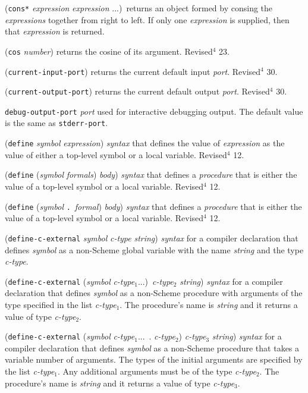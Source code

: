 \documentclass[10pt,twocolumn]{article}
\begin{document}
(\texttt{cons*} \emph{expression} \emph{expression} ...)\ returns an object
formed by consing the \emph{expressions} together from right to left. If
only one \emph{expression} is supplied, then that \emph{expression} is
returned.

(\texttt{cos} \emph{number}) returns the cosine of its argument.  Revised$^4$
23.

(\texttt{current-input-port}) returns the current default input \emph{port}.
Revised$^4$ 30.

(\texttt{current-output-port}) returns the current default output \emph{port}.
Revised$^4$ 30.

\texttt{debug-output-port} \emph{port} used for interactive debugging output.
The default value is the same as \texttt{stderr-port}.

(\texttt{define} \emph{symbol} \emph{expression}) \emph{syntax} that
defines the value of \emph{expression} as the value of either a
top-level symbol or a local variable.  Revised$^4$ 12.

(\texttt{define} (\emph{symbol} \emph{formals}) \emph{body}) \emph{syntax}
that defines a \emph{procedure} that is either the value of a
top-level symbol or a local variable. Revised$^4$ 12.

(\texttt{define} (\emph{symbol} \texttt{.}\ \emph{formal}) \emph{body}) \emph{syntax} that
defines a \emph{procedure} that is either the value of a top-level symbol
or a local variable. Revised$^4$ 12.

(\texttt{define-c-external} \emph{symbol} \emph{c-type} \emph{string}) \emph{syntax}
for a compiler declaration that defines \emph{symbol} as a non-Scheme
global variable with the name \emph{string} and the type \emph{c-type}.

(\texttt{define-c-external} (\emph{symbol} \emph{c-type}$_1$...)\
\emph{c-type}$_2$ \emph{string}) \emph{syntax} for a compiler declaration
that defines \emph{symbol} as a non-Scheme procedure with arguments of
the type specified in the list \emph{c-type}$_1$.  The procedure's name
is \emph{string} and it returns a value of type \emph{c-type}$_2$.

(\texttt{define-c-external} (\emph{symbol} \emph{c-type}$_1$...\ .
\emph{c-type}$_2$) \emph{c-type}$_3$ \emph{string}) \emph{syntax} for a
compiler declaration that defines \emph{symbol} as a non-Scheme
procedure that takes a variable number of arguments.  The types of
the initial arguments are specified by the  list \emph{c-type}$_1$.
Any additional arguments must be of the type \emph{c-type}$_2$.  The
procedure's name is \emph{string} and it returns a value of type
\emph{c-type}$_3$.
\end{document}
